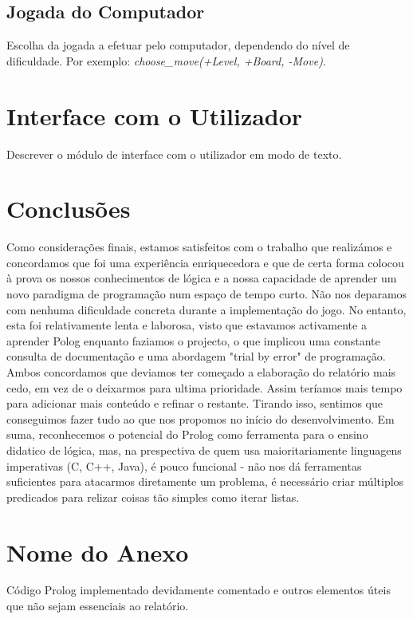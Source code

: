 \documentclass[a4paper]{article}
\begin{document}
\subsection{Jogada do Computador} Escolha da jogada a efetuar pelo computador, dependendo do nível de dificuldade. Por exemplo: \textit{choose\_move(+Level, +Board, -Move)}.


\section{Interface com o Utilizador}

Descrever o módulo de interface com o utilizador em modo de texto.


\section{Conclusões}
Como considerações finais, estamos satisfeitos com o trabalho que realizámos e concordamos que foi uma experiência enriquecedora e que de certa forma colocou à prova os nossos conhecimentos de lógica e a nossa capacidade de aprender um novo paradigma de programação num espaço de tempo curto.
Não nos deparamos com nenhuma dificuldade concreta durante a implementação do jogo. No entanto, esta foi relativamente lenta e laborosa, visto que estavamos activamente a aprender Polog enquanto faziamos o projecto, o que implicou uma constante consulta de documentação e uma abordagem "trial by error" de programação.
Ambos concordamos que deviamos ter começado a elaboração do relatório mais cedo, em vez de o deixarmos para ultima prioridade. Assim teríamos mais tempo para adicionar mais conteúdo e refinar o restante. Tirando isso, sentimos que conseguimos fazer tudo ao que nos propomos no início do desenvolvimento.
Em suma, reconhecemos o potencial do Prolog como ferramenta para o ensino didatico de lógica, mas, na prespectiva de quem usa maioritariamente linguagens imperativas (C, C++, Java), é pouco funcional - não nos dá ferramentas suficientes para atacarmos diretamente um problema, é necessário criar múltiplos predicados para relizar coisas tão simples como iterar listas.



\clearpage
{}
\renewcommand\refname{Bibliografia}



\newpage
\appendix
\section{Nome do Anexo}
Código Prolog implementado devidamente comentado e outros elementos úteis que não sejam essenciais ao relatório.
\end{document}
